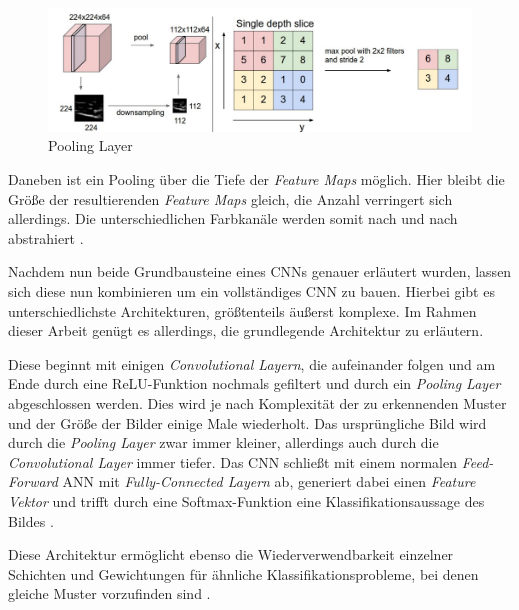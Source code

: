 \begin{figure}[H]
	\begin{center}
		\includegraphics[width=15cm]{Bilder/pooling_layer.png} 
		\caption[Pooling Layer]{Pooling Layer \cite{LeonadroAraujoSantos.2018}}
		\label{pooling_layer}
	\end{center}
\end{figure}

Daneben ist ein Pooling über die Tiefe der \textit{Feature Maps} möglich. Hier bleibt die Größe der resultierenden \textit{Feature Maps} gleich, die Anzahl verringert sich allerdings. Die unterschiedlichen Farbkanäle werden somit nach und nach abstrahiert \cite{AurelienGeron.2018}.

Nachdem nun beide Grundbausteine eines CNNs genauer erläutert wurden, lassen sich diese nun kombinieren um ein vollständiges CNN zu bauen. Hierbei gibt es unterschiedlichste Architekturen, größtenteils äußerst komplexe. Im Rahmen dieser Arbeit genügt es allerdings, die grundlegende Architektur zu erläutern.

Diese beginnt mit einigen \textit{Convolutional Layern}, die aufeinander folgen und am Ende durch eine ReLU-Funktion nochmals gefiltert und durch ein \textit{Pooling Layer} abgeschlossen werden. Dies wird je nach Komplexität der zu erkennenden Muster und der Größe der Bilder einige Male wiederholt. Das ursprüngliche Bild wird durch die \textit{Pooling Layer} zwar immer kleiner, allerdings auch durch die \textit{Convolutional Layer} immer tiefer. Das CNN schließt mit einem normalen \textit{Feed-Forward} ANN mit \textit{Fully-Connected Layern} ab, generiert dabei einen \textit{Feature Vektor} und trifft durch eine Softmax-Funktion eine Klassifikationsaussage des Bildes \cite{AurelienGeron.2018}. 

Diese Architektur ermöglicht ebenso die Wiederverwendbarkeit einzelner Schichten und Gewichtungen für ähnliche Klassifikationsprobleme, bei denen gleiche Muster vorzufinden sind \cite{AurelienGeron.2018}.